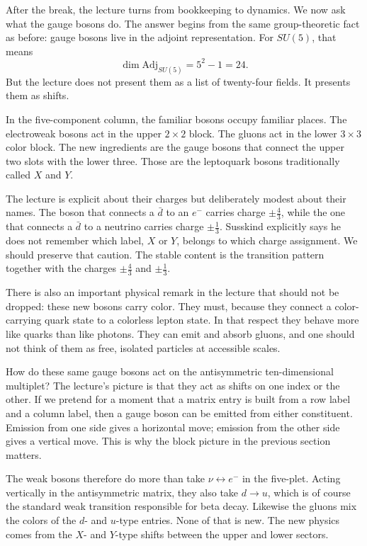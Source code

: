 After the break, the lecture turns from bookkeeping to dynamics. We now ask what the gauge bosons do. The answer begins from the same group-theoretic fact as before: gauge bosons live in the adjoint representation. For \(SU(5)\), that means
\begin{equation}
\dim \mathrm{Adj}_{SU(5)} = 5^2-1 = 24.
\end{equation}
But the lecture does not present them as a list of twenty-four fields. It presents them as shifts.

In the five-component column, the familiar bosons occupy familiar places. The electroweak bosons act in the upper \(2\times 2\) block. The gluons act in the lower \(3\times 3\) color block. The new ingredients are the gauge bosons that connect the upper two slots with the lower three. Those are the leptoquark bosons traditionally called \(X\) and \(Y\).

The lecture is explicit about their charges but deliberately modest about their names. The boson that connects a \(\bar d\) to an \(e^-\) carries charge \(\pm \tfrac43\), while the one that connects a \(\bar d\) to a neutrino carries charge \(\pm \tfrac13\). Susskind explicitly says he does not remember which label, \(X\) or \(Y\), belongs to which charge assignment. We should preserve that caution. The stable content is the transition pattern together with the charges \(\pm \tfrac43\) and \(\pm \tfrac13\).

There is also an important physical remark in the lecture that should not be dropped: these new bosons carry color. They must, because they connect a color-carrying quark state to a colorless lepton state. In that respect they behave more like quarks than like photons. They can emit and absorb gluons, and one should not think of them as free, isolated particles at accessible scales.

How do these same gauge bosons act on the antisymmetric ten-dimensional multiplet? The lecture's picture is that they act as shifts on one index or the other. If we pretend for a moment that a matrix entry is built from a row label and a column label, then a gauge boson can be emitted from either constituent. Emission from one side gives a horizontal move; emission from the other side gives a vertical move. This is why the block picture in the previous section matters.

The weak bosons therefore do more than take \(\nu\leftrightarrow e^-\) in the five-plet. Acting vertically in the antisymmetric matrix, they also take \(d\to u\), which is of course the standard weak transition responsible for beta decay. Likewise the gluons mix the colors of the \(d\)- and \(u\)-type entries. None of that is new. The new physics comes from the \(X\)- and \(Y\)-type shifts between the upper and lower sectors.

